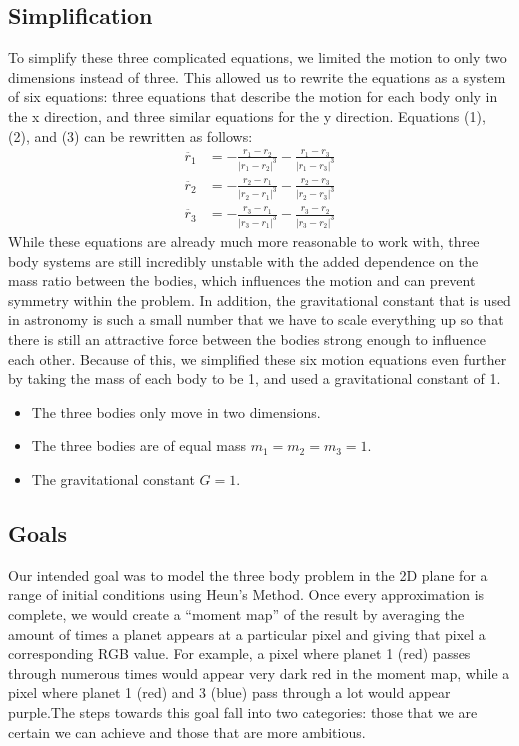\documentclass{article}
\begin{document}
\subsection{Simplification}

To simplify these three complicated equations, we limited the motion to only two dimensions instead of three. This allowed us to rewrite the equations as a system of six equations: three equations that describe the motion for each body only in the x direction, and three similar equations for the y direction. 
Equations (1), (2), and (3) can be rewritten as follows:
\begin{align}
    \ddot{r_1} &= -\frac{r_1-r_2}{|r_1-r_2|^3}-\frac{r_1-r_3}{|r_1-r_3|^3}\\
    \ddot{r_2} &= -\frac{r_2-r_1}{|r_2-r_1|^3}-\frac{r_2-r_3}{|r_2-r_3|^3}\\
    \ddot{r_3} &= -\frac{r_3-r_1}{|r_3-r_1|^3}-\frac{r_3-r_2}{|r_3-r_2|^3}
\end{align}
While these equations are already much more reasonable to work with, three body systems are still incredibly unstable with the added dependence on the mass ratio between the bodies, which influences the motion and can prevent symmetry within the problem. In addition, the gravitational constant that is used in astronomy is such a small number that we have to scale everything up so that there is still an attractive force between the bodies strong enough to influence each other. Because of this, we simplified these six motion equations even further by taking the mass of each body to be 1, and used a gravitational constant of 1. 
\begin{itemize}
    \item The three bodies only move in two dimensions.
    \item The three bodies are of equal mass $m_1 = m_2 = m_3 = 1$.
    \item The gravitational constant $G = 1$.
\end{itemize}

\subsection{Goals}
Our intended goal was to model the three body problem in the 2D plane for a range of initial conditions using Heun's Method. Once every approximation is complete, we would create a “moment map” of the result by averaging the amount of times a planet appears at a particular pixel and giving that pixel a corresponding RGB value. For example, a pixel where planet 1 (red) passes through numerous times would appear very dark red in the moment map, while a pixel where planet 1 (red) and 3 (blue) pass through a lot would appear purple.The steps towards this goal fall into two categories: those that we are certain we can achieve and those that are more ambitious.
\end{document}
